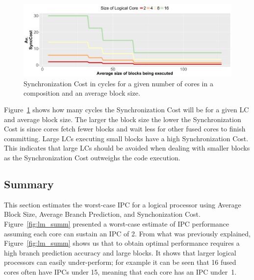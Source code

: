 \begin{figure}[h]
    \centering
    \includegraphics[width=\textwidth]{cases-paper/graphics/limit_study/sync_cost.pdf}

    \caption{Synchronization Cost in cycles for a given number of cores in a composition and an average block size.} %
    \label{fig:sync_cost}
	\vspace{1em}
\end{figure}

Figure~\ref{fig:sync_cost} shows how many cycles the Synchronization Cost will be for a given LC and average block size.
The larger the block size the lower the Synchronization Cost is since cores fetch fewer blocks and wait less for other fused cores to finish committing.
Large LCs executing small blocks have a high Synchronization Cost. 
This indicates that large LCs should be avoided when dealing with smaller blocks as the Synchronization Cost outweighs the code execution.

\subsection{Summary}

This section estimates the worst-case IPC for a logical processor using Average Block Size, Average Branch Prediction, and Synchonization Cost.
Figure~\ref{fig:lm_summ} presented a worst-case estimate of IPC performance assuming each core can sustain an IPC of 2.
From what was previously explained, Figure~\ref{fig:lm_summ} shows us that to obtain optimal performance requires a high branch prediction accuracy and large blocks.
It shows that larger logical processors can easily under-perform; for example it can be seen that 16 fused cores often have IPCs under 15, meaning that each core has an IPC under~1.

